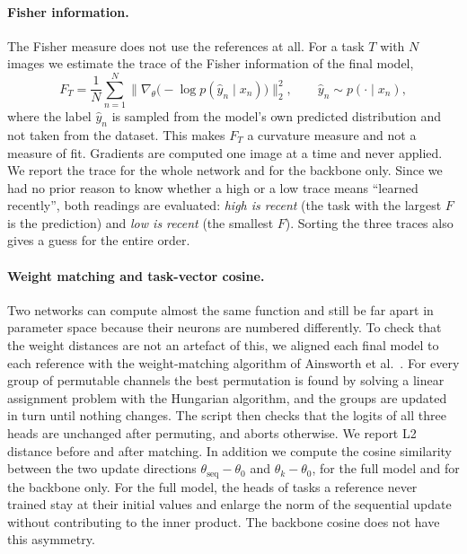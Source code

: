 \documentclass[11pt,a4paper]{article}
\begin{document}
\paragraph{Fisher information.} The Fisher measure does not use the references at all. For a task $T$ with $N$ images we estimate the trace of the Fisher information of the final model,
\begin{equation}
  F_T = \frac{1}{N}\sum_{n=1}^{N} \bigl\lVert \nabla_\theta \bigl(-\log p(\hat y_n \mid x_n)\bigr) \bigr\rVert_2^2, \qquad \hat y_n \sim p(\cdot \mid x_n),
\end{equation}
where the label $\hat y_n$ is sampled from the model's own predicted distribution and not taken from the dataset. This makes $F_T$ a curvature measure and not a measure of fit. Gradients are computed one image at a time and never applied. We report the trace for the whole network and for the backbone only. Since we had no prior reason to know whether a high or a low trace means ``learned recently'', both readings are evaluated: \emph{high is recent} (the task with the largest $F$ is the prediction) and \emph{low is recent} (the smallest $F$). Sorting the three traces also gives a guess for the entire order.

\paragraph{Weight matching and task-vector cosine.} Two networks can compute almost the same function and still be far apart in parameter space because their neurons are numbered differently. To check that the weight distances are not an artefact of this, we aligned each final model to each reference with the weight-matching algorithm of Ainsworth et al.\ \cite{ainsworth2023}. For every group of permutable channels the best permutation is found by solving a linear assignment problem with the Hungarian algorithm, and the groups are updated in turn until nothing changes. The script then checks that the logits of all three heads are unchanged after permuting, and aborts otherwise. We report L2 distance before and after matching. In addition we compute the cosine similarity between the two update directions $\theta_\mathrm{seq}-\theta_0$ and $\theta_k-\theta_0$, for the full model and for the backbone only. For the full model, the heads of tasks a reference never trained stay at their initial values and enlarge the norm of the sequential update without contributing to the inner product. The backbone cosine does not have this asymmetry.
\end{document}
